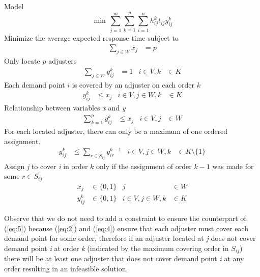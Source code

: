 Model
{\small
  \begin{equation}
    \min \, \sum_{j=1}^{m}{
      \sum_{k=1}^{p}{
        \sum_{i=1}^{n}{
          h_{ij}^{k}t_{ij}y_{ij}^{k}
        }
      }
    }
  \end{equation}
}
Minimize the average expected response time
subject to
\begin{align}
  \label{eq:2}
  \sum_{j \in W}{x_j}
  & = p
\end{align}
Only locate $p$ adjusters
\begin{align}
  \label{eq:3}
  \sum_{j \in W}{y_{ij}^{k}}
  & = 1
  & i \in V, k
  &\in K
\end{align}
Each demand point $i$ is covered by an adjuster on each order $k$
\begin{align}
  \label{eq:4}
  y_{ij}^{k}
  & \leq x_j
  & i \in V,j \in W, k
  &\in K
\end{align}
Relationship between variables \textit{x} and \textit{y}
\begin{align}
  \label{eq:5}
  \sum_{k = 1}^{p}{
    y_{ij}^{k}
  }
  & \leq x_j
  & i \in V, j 
  & \in W
\end{align}
For each located adjuster,
there can only be
a maximum of one ordered assignment.
\begin{align}
  y_{ij}^{k} 
  & \leq \sum_{r\in S_{ij}}{y_{ir}^{k-1}}
  & i \in V,j \in W, k
  & \in K\setminus\{1\}
\end{align}
Assign \textit{j} to cover \textit{i} in order $k$
only if
the assignment of order $k-1$
was made for some $r \in S_{ij}$
\begin{align}
  x_{j}
  & \in \{0,1\}
  & j 
  & \in W \nonumber
  \\
  y_{ij}^{k}
  & \in \{0,1\}
  &  i \in V,j \in W,k
  &\in K \nonumber
\end{align}

Observe that
we do not need
to add a constraint
to ensure
the counterpart of (\ref{eq:5})
because (\ref{eq:2}) and (\ref{eq:4})
ensure that
each adjuster
must cover each demand point
for some order,
therefore
if an adjuster located at \textit{j}
does not cover demand point \textit{i}
at order \textit{k}
(indicated by
the maximum covering order in $S_{ij}$)
there will be at least
one adjuster
that does not cover
demand point \textit{i}
at any order
resulting in an infeasible solution.
